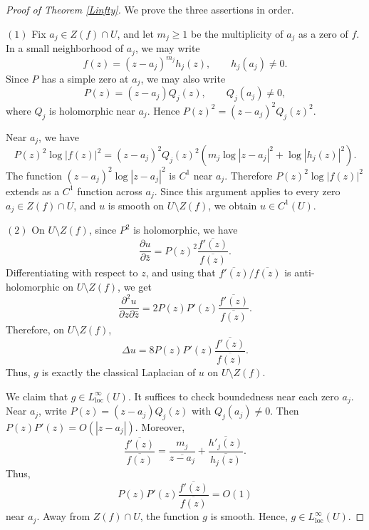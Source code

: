 \documentclass[10pt,a4paper]{amsart}
\begin{document}
\begin{proof}[Proof of Theorem \ref{Linfty}]

We prove the three assertions in order.

$(1)$ Fix $a_j\in Z(f)\cap U$, and let $m_j\ge1$ be the multiplicity of $a_j$ as a zero of $f$.
In a small neighborhood of $a_j$, we may write
$$
f(z)=(z-a_j)^{m_j}h_j(z),
\qquad h_j(a_j)\neq0.
$$
Since $P$ has a simple zero at $a_j$, we may also write
$$
P(z)=(z-a_j)Q_j(z),
\qquad Q_j(a_j)\neq0,
$$
where $Q_j$ is holomorphic near $a_j$. Hence $P(z)^2=(z-a_j)^2Q_j(z)^2$.

Near $a_j$, we have
$$
P(z)^2\log|f(z)|^2
=
(z-a_j)^2Q_j(z)^2
\left(
m_j\log|z-a_j|^2+\log|h_j(z)|^2
\right).
$$
The function $(z-a_j)^2\log|z-a_j|^2$ is $C^1$ near $a_j$. Therefore
$P(z)^2\log|f(z)|^2$ extends as a $C^1$ function across $a_j$.
Since this argument applies to every zero $a_j\in Z(f)\cap U$, and $u$ is smooth on
$U\setminus Z(f)$, we obtain $u\in C^1(U)$.

$(2)$ On $U\setminus Z(f)$, since $P^2$ is holomorphic, we have
$$
\frac{\partial u}{\partial\bar z}
=
P(z)^2\frac{\overline{f'(z)}}{\overline{f(z)}}.
$$
Differentiating with respect to $z$, and using that
$\overline{f'(z)}/\overline{f(z)}$ is anti-holomorphic on $U\setminus Z(f)$, we get
$$
\frac{\partial^2 u}{\partial z\partial\bar z}
=
2P(z)P'(z)\frac{\overline{f'(z)}}{\overline{f(z)}}.
$$
Therefore, on $U\setminus Z(f)$,
$$
\Delta u
=
8P(z)P'(z)\frac{\overline{f'(z)}}{\overline{f(z)}}.
$$
Thus, $g$ is exactly the classical Laplacian of $u$ on $U\setminus Z(f)$.

We claim that $g\in L^\infty_{\mathrm{loc}}(U)$. It suffices to check boundedness near each zero
$a_j$. Near $a_j$, write $P(z)=(z-a_j)Q_j(z)$ with $Q_j(a_j)\neq0$. Then
$P(z)P'(z)=O(|z-a_j|)$. Moreover,
$$
\frac{\overline{f'(z)}}{\overline{f(z)}}
= \frac{m_j}{\overline{z - a_j}} + \frac{\overline{h'_j(z)}}{\overline{h_j(z)}}.
$$
Thus,
$$
P(z)P'(z)\frac{\overline{f'(z)}}{\overline{f(z)}}=O(1)
$$
near $a_j$. Away from $Z(f)\cap U$, the function $g$ is smooth. Hence,
$g\in L^\infty_{\mathrm{loc}}(U)$.


\end{proof}
\end{document}
